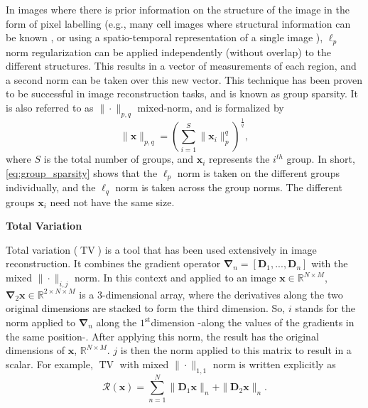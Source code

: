 In images where there is prior information on the structure of the image in the form of pixel labelling (e.g., many cell images where structural information can be known \cite{baritaux_sparsity-driven_2011}, or using a spatio-temporal representation of a single image \cite{del_aguila_pla_cell_2018-1, del_aguila_pla_cell_2018}), $\ell_p$ norm regularization can be applied independently (without overlap) to the different structures. This results in a vector of measurements of each region, and a second norm can be taken over this new vector. This technique has been proven to be successful in image reconstruction tasks, and is known as group sparsity. It is also referred to as $\|\cdot\|_{p, q}$ mixed-norm, and is formalized by
\begin{equation}
    \|\mathbf{x}\|_{p, q} = \left(\sum^S_{i = 1}\|\mathbf{x}_i\|_p^q\right)^\frac{1}{q},
    \label{eq:group_sparsity}
\end{equation}
where $S$ is the total number of groups, and $\mathbf{x}_i$ represents the $i^{th}$ group. In short, \eqref{eq:group_sparsity} shows that the $\ell_p$ norm is taken on the different groups individually, and the $\ell_q$ norm is taken across the group norms. The different groups $\mathbf{x}_i$ need not have the same size.  

\noindent\textbf{Total Variation \cite{chambolle_image_1997, chambolle_introduction_2009}}

Total variation ($\operatorname{TV}$) is a tool that has been used extensively in image reconstruction. It combines the gradient operator  $\mathbf{\nabla}_n = [\mathbf{D}_1, ..., \mathbf{D}_n]$ with the mixed $\|\cdot\|_{i,j}$ norm. In this context and applied to an image $\mathbf{x} \in \mathbb{R}^{N \times M}$, $\mathbf{\nabla}_2\mathbf{x} \in \mathbb{R}^{2\times N \times M}$ is a $3$-dimensional array, where the derivatives along the two original dimensions are stacked to form the third dimension. So, $i$ stands for the norm applied to $\mathbf{\nabla}_n$ along the $1^{\mathrm{st}}$dimension -along the values of the gradients in the same position-. After applying this norm, the result has the original dimensions of $\mathbf{x}$,  $\mathbb{R}^{N \times M}$. $j$ is then the norm applied to this matrix to result in a scalar. For example, $\operatorname{TV}$ with mixed $\|\cdot \|_{1, 1}$ norm is written explicitly as
\begin{equation}
    \mathcal{R}(\mathbf{x}) = \sum^N_{n = 1}\|\mathbf{D}_1\mathbf{x}\|_n + \|\mathbf{D}_2\mathbf{x}\|_n.
    \label{eq:tv11}
\end{equation}

